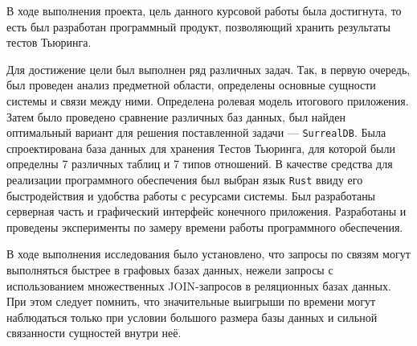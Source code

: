 В ходе выполнения проекта, цель данного курсовой работы была достигнута, то есть был разработан программный продукт, позволяющий хранить результаты тестов Тьюринга.

Для достижение цели был выполнен ряд различных задач. 
Так, в первую очередь, был проведен анализ предметной области, определены основные сущности системы и связи между ними. 
Определена ролевая модель итогового приложения.
Затем было проведено сравнение различных баз данных, был найден оптимальный вариант для решения поставленной задачи --- \texttt{SurrealDB}.
Была спроектирована база данных для хранения Тестов Тьюринга, для которой были определны 7 различных таблиц и 7 типов отношений.
В качестве средства для реализации программного обеспечения был выбран язык \texttt{Rust} ввиду его быстродействия и удобства работы с ресурсами системы.
Был разработаны серверная часть и графический интерфейс конечного приложения. Разработаны и проведены эксперименты по замеру времени работы программного обеспечения.

В ходе выполнения исследования было установлено, что запросы по связям могут выполняться быстрее в графовых базах данных, нежели запросы с использованием множественных JOIN-запросов в реляционных базах данных.
При этом следует помнить, что значительные выигрыши по времени могут наблюдаться только при условии большого размера базы данных и сильной связанности сущностей внутри неё.
